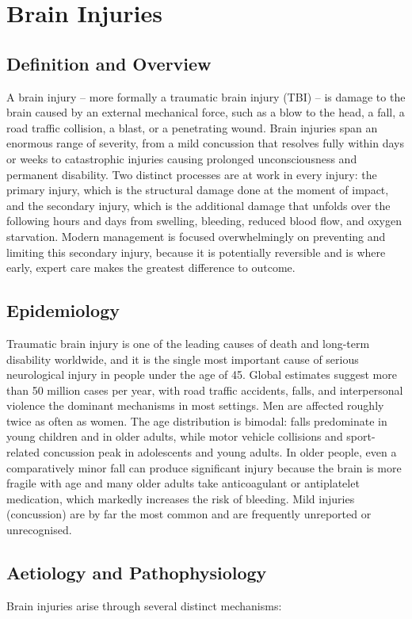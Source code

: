 \chapter{Brain Injuries}

\section*{Definition and Overview}
A brain injury -- more formally a traumatic brain injury (TBI) -- is damage to the brain caused by an external mechanical force, such as a blow to the head, a fall, a road traffic collision, a blast, or a penetrating wound. Brain injuries span an enormous range of severity, from a mild concussion that resolves fully within days or weeks to catastrophic injuries causing prolonged unconsciousness and permanent disability. Two distinct processes are at work in every injury: the primary injury, which is the structural damage done at the moment of impact, and the secondary injury, which is the additional damage that unfolds over the following hours and days from swelling, bleeding, reduced blood flow, and oxygen starvation. Modern management is focused overwhelmingly on preventing and limiting this secondary injury, because it is potentially reversible and is where early, expert care makes the greatest difference to outcome.

\section*{Epidemiology}
Traumatic brain injury is one of the leading causes of death and long-term disability worldwide, and it is the single most important cause of serious neurological injury in people under the age of 45. Global estimates suggest more than 50 million cases per year, with road traffic accidents, falls, and interpersonal violence the dominant mechanisms in most settings. Men are affected roughly twice as often as women. The age distribution is bimodal: falls predominate in young children and in older adults, while motor vehicle collisions and sport-related concussion peak in adolescents and young adults. In older people, even a comparatively minor fall can produce significant injury because the brain is more fragile with age and many older adults take anticoagulant or antiplatelet medication, which markedly increases the risk of bleeding. Mild injuries (concussion) are by far the most common and are frequently unreported or unrecognised.

\section*{Aetiology and Pathophysiology}
Brain injuries arise through several distinct mechanisms:

